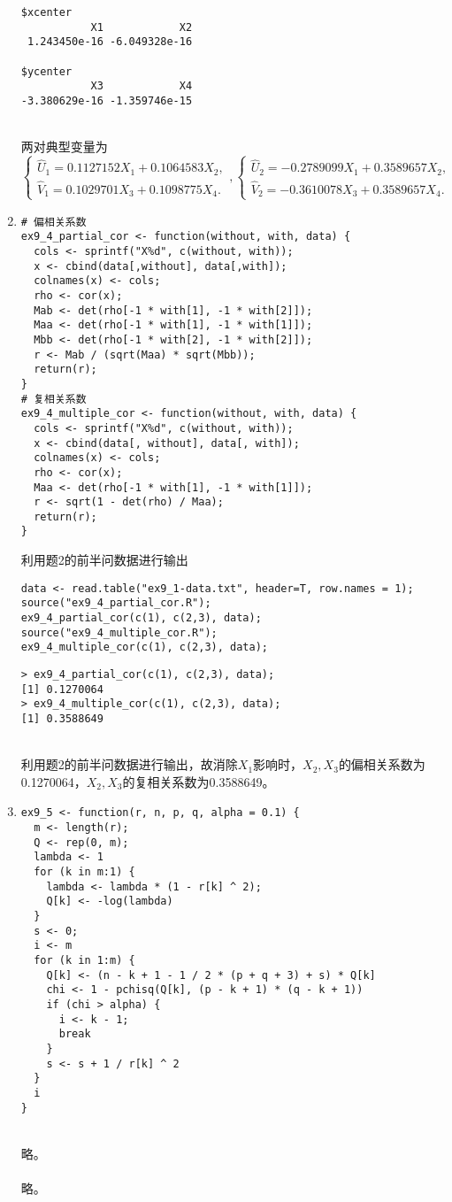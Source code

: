 \begin{enumerate}
\begin{lstlisting}
$xcenter
           X1            X2 
 1.243450e-16 -6.049328e-16 

$ycenter
           X3            X4 
-3.380629e-16 -1.359746e-15 
\end{lstlisting}
    \summary\\
    两对典型变量为
    \[\begin{cases}
        \hat{U}_1 = 0.1127152X_1 + 0.1064583X_2,\\
        \hat{V}_1 = 0.1029701X_3 + 0.1098775X_4.
    \end{cases},\begin{cases}
        \hat{U}_2 = -0.2789099X_1 + 0.3589657X_2,\\
        \hat{V}_2 = -0.3610078X_3 + 0.3589657X_4.
    \end{cases}\]
    \item
    \code
\begin{lstlisting}
# 偏相关系数
ex9_4_partial_cor <- function(without, with, data) {
  cols <- sprintf("X%d", c(without, with));
  x <- cbind(data[,without], data[,with]);
  colnames(x) <- cols;
  rho <- cor(x);
  Mab <- det(rho[-1 * with[1], -1 * with[2]]);
  Maa <- det(rho[-1 * with[1], -1 * with[1]]);
  Mbb <- det(rho[-1 * with[2], -1 * with[2]]);
  r <- Mab / (sqrt(Maa) * sqrt(Mbb));
  return(r);
}
# 复相关系数
ex9_4_multiple_cor <- function(without, with, data) {
  cols <- sprintf("X%d", c(without, with));
  x <- cbind(data[, without], data[, with]);
  colnames(x) <- cols;
  rho <- cor(x);
  Maa <- det(rho[-1 * with[1], -1 * with[1]]);
  r <- sqrt(1 - det(rho) / Maa);
  return(r);
}
\end{lstlisting}
利用题2的前半问数据进行输出
\begin{lstlisting}
data <- read.table("ex9_1-data.txt", header=T, row.names = 1);
source("ex9_4_partial_cor.R");
ex9_4_partial_cor(c(1), c(2,3), data);
source("ex9_4_multiple_cor.R");
ex9_4_multiple_cor(c(1), c(2,3), data);
\end{lstlisting}
    \out
\begin{lstlisting}
> ex9_4_partial_cor(c(1), c(2,3), data);
[1] 0.1270064
> ex9_4_multiple_cor(c(1), c(2,3), data);
[1] 0.3588649
\end{lstlisting}
    \summary\\
    利用题2的前半问数据进行输出，故消除$X_1$影响时，$X_2,X_3$的偏相关系数为0.1270064，$X_2,X_3$的复相关系数为0.3588649。
    \item
    \code
\begin{lstlisting}
ex9_5 <- function(r, n, p, q, alpha = 0.1) {
  m <- length(r);
  Q <- rep(0, m);
  lambda <- 1
  for (k in m:1) {
    lambda <- lambda * (1 - r[k] ^ 2);
    Q[k] <- -log(lambda)
  }
  s <- 0;
  i <- m
  for (k in 1:m) {
    Q[k] <- (n - k + 1 - 1 / 2 * (p + q + 3) + s) * Q[k]
    chi <- 1 - pchisq(Q[k], (p - k + 1) * (q - k + 1))
    if (chi > alpha) {
      i <- k - 1;
      break
    }
    s <- s + 1 / r[k] ^ 2
  }
  i
}
\end{lstlisting}
    \out\\
    略。\\
    \summary\\
    略。
\end{enumerate}